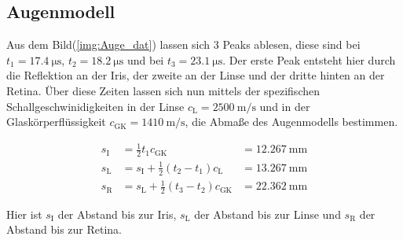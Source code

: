     \subsection{Augenmodell}

        \noindent Aus dem Bild(\ref{img:Auge_dat}) lassen sich 3 Peaks ablesen, diese sind bei $t_1 = \SI{17.4}{\micro \second}$, 
        $t_2 = \SI{18.2}{\micro \second}$ und bei $t_3 = \SI{23.1}{\micro \second}$. Der erste Peak entsteht hier durch die Reflektion an der Iris, 
        der zweite an der Linse und der dritte hinten an der Retina. Über diese Zeiten lassen sich nun mittels der spezifischen 
        Schallgeschwinidigkeiten in der Linse $c_{\text{L}} = \SI{2500}{\meter\per\second}$ und in der Glaskörperflüssigkeit 
        $c_{\text{GK}} = \SI{1410}{\meter\per\second}$, die Abmaße des Augenmodells bestimmen. 

        \begin{align*}
             s_{\text{I}} & = \frac{1}{2} t_1 c_{\text{GK}}                      &= \SI{12.267}{\milli\metre}   \\
             s_{\text{L}} & = s_{\text{I}} + \frac{1}{2} (t_2-t_1) c_{\text{L}}  &= \SI{13.267}{\milli\metre}  \\
             s_{\text{R}} & = s_{\text{L}} + \frac{1}{2} (t_3-t_2) c_{\text{GK}} &= \SI{22.362}{\milli\metre} 
        \end{align*}

        \noindent Hier ist $s_{\text{I}}$ der Abstand bis zur Iris, $s_{\text{L}}$ der Abstand bis zur Linse und $s_{\text{R}}$ der Abstand 
        bis zur Retina.